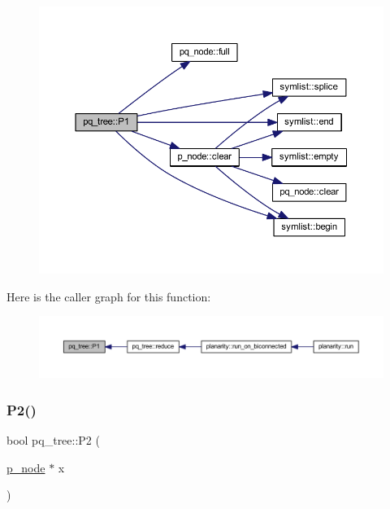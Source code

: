 \begin{figure}[H]
\begin{center}
\leavevmode
\includegraphics[width=350pt]{classpq__tree_a3f3e775ad71be792aaf061d99d7d2af8_cgraph}
\end{center}
\end{figure}
Here is the caller graph for this function\+:\nopagebreak
\begin{figure}[H]
\begin{center}
\leavevmode
\includegraphics[width=350pt]{classpq__tree_a3f3e775ad71be792aaf061d99d7d2af8_icgraph}
\end{center}
\end{figure}
\mbox{\label{classpq__tree_a38e09d7b7f7627dde9cb20a869e09e96}} 
\subsubsection{\texorpdfstring{P2()}{P2()}}
{\footnotesize\ttfamily bool pq\+\_\+tree\+::\+P2 (\begin{DoxyParamCaption}\item[{\mbox{\hyperlink{classp__node}{p\+\_\+node}} $\ast$}]{x }\end{DoxyParamCaption})\hspace{0.3cm}{\ttfamily [private]}}



